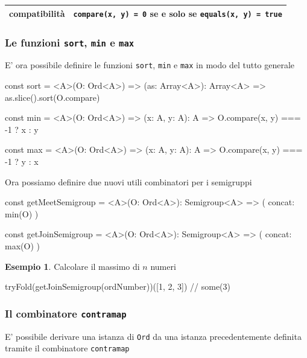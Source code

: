 \documentclass[12pt]{article}
\theoremstyle{definition}
\newtheorem{example}{Esempio}[section]
\newenvironment{code}
  {\vspace{0.5cm} \VerbatimEnvironment\begin{typescriptcode}}
  {\end{typescriptcode} \vspace{0.2cm}}
\begin{document}
\begin{center}
\bgroup
\def\arraystretch{1.5}
\begin{tabular}{ |c|p{10cm}| }
\hline
compatibilità & \texttt{compare(x, y) = 0} se e solo se \texttt{equals(x, y) = true} \\
\hline
\end{tabular}
\egroup
\end{center}

\subsubsection{Le funzioni \texttt{sort}, \texttt{min} e \texttt{max}}

E' ora possibile definire le funzioni \texttt{sort}, \texttt{min} e \texttt{max} in modo del tutto generale

\begin{code}
const sort = <A>(O: Ord<A>) => (as: Array<A>): Array<A> =>
  as.slice().sort(O.compare)

const min = <A>(O: Ord<A>) => (x: A, y: A): A =>
  O.compare(x, y) === -1 ? x : y

const max = <A>(O: Ord<A>) => (x: A, y: A): A =>
  O.compare(x, y) === -1 ? y : x
\end{code}

Ora possiamo definire due nuovi utili combinatori per i semigruppi

\begin{code}
const getMeetSemigroup = <A>(O: Ord<A>): Semigroup<A> => ({
  concat: min(O)
})

const getJoinSemigroup = <A>(O: Ord<A>): Semigroup<A> => ({
  concat: max(O)
})
\end{code}

\begin{example}
Calcolare il massimo di $n$ numeri

\begin{code}
tryFold(getJoinSemigroup(ordNumber))([1, 2, 3]) // some(3)
\end{code}
\end{example}

\subsubsection{Il combinatore \texttt{contramap}}

E' possibile derivare una istanza di \texttt{Ord} da una istanza precedentemente definita tramite il combinatore \texttt{contramap}
\end{document}
